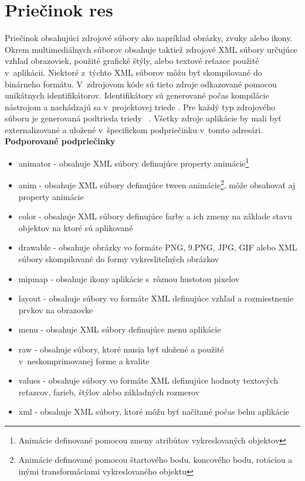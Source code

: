 \section{Priečinok res}
\label{res}
Priečinok obsahujúci zdrojové súbory ako napríklad obrázky, zvuky alebo ikony. Okrem multimediálnych súborov obsahuje taktiež zdrojové XML súbory určujúce vzhľad obrazoviek, použité grafické štýly, alebo textové reťazce použité v~aplikácii. Niektoré z~týchto XML súborov môžu byť skompilované do binárneho formátu. V~zdrojovom kóde sú tieto zdroje odkazované pomocou unikátnych identifikátorov. Identifikátory sú generované počas kompilácie nástrojom  a nachádzajú sa v~projektovej triede . Pre každý typ zdrojového súboru je generovaná podtrieda triedy ~\cite{accessingRes}. Všetky zdroje aplikácie by mali byť externalizované a uložené v~špecifickom podpriečinku v~tomto adresári. \newpage
\textbf{Podporované podpriečinky}~\cite{providingRes}
\begin{itemize}
\item animator - obsahuje XML súbory definujúce property animácie\footnote{Animácie definované pomocou zmeny atribútov vykreslovaných objektov}
\item anim - obsahuje XML súbory definujúce tween animácie\footnote{Animácie definované pomocou štartového bodu, koncového bodu, rotáciou a inými transformáciami vykreslovaného objektu}, môže obsahovať aj property animácie
\item color - obsahuje XML súbory definujúce farby a ich zmeny na základe stavu objektov na ktoré sú aplikované
\item drawable - obsahuje obrázky vo formáte PNG, 9.PNG, JPG, GIF alebo XML súbory skompilované do formy vykresliteľných obrázkov
\item mipmap - obsahuje ikony aplikácie s~rôznou hustotou pixelov
\item layout - obsahuje súbory vo formáte XML definujúce vzhľad a rozmiestnenie prvkov na obrazovke
\item menu - obsahuje XML súbory definujúce menu aplikácie
\item raw - obsahuje súbory, ktoré musia byť uložené a použité v~neskomprimovanej forme a kvalite
\item values - obsahuje súbory vo formáte XML definujúce hodnoty textových reťazcov, farieb, štýlov alebo základných rozmerov
\item xml - obsahuje XML súbory, ktoré môžu byť načítané počas behu aplikácie
\end{itemize}

